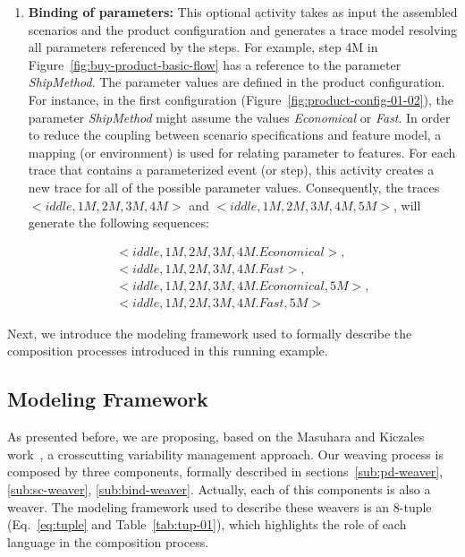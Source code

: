 \documentclass{acm_proc_article-sp}
\begin{document}
\begin{description}
\begin{enumerate}
 \item {\bf Binding of parameters:}  This optional activity takes as input the assembled scenarios and the product configuration and generates 
 a trace model resolving all parameters referenced by the steps. For example, step 4M in Figure~\ref{fig:buy-product-basic-flow} has a reference 
 to the parameter \emph{ShipMethod}. The parameter values are defined in the product configuration. For instance, in the 
 first configuration (Figure~\ref{fig:product-config-01-02}), the parameter \emph{ShipMethod} might assume the values \emph{Economical} or 
 \emph{Fast}. In order to reduce the coupling between scenario specifications and feature model, a mapping (or environment) is used for relating 
 parameter to features. For each trace that contains a parameterized event (or step), this activity creates a new trace for all of the possible parameter 
 values. Consequently, the traces $<iddle,1M,2M,3M,4M>$ and $<iddle, 1M, 2M, 3M, 4M, 5M>$, will generate the following sequences:
 
\begin{small}
\begin{eqnarray*}
<iddle,1M,2M,3M,4M.Economical>, \\ <iddle,1M,2M,3M,4M.Fast>, \\
<iddle,1M,2M,3M,4M.Economical,5M>, \\ <iddle,1M,2M,3M,4M.Fast, 5M>
\end{eqnarray*}
\end{small}
 
\end{enumerate}

Next, we introduce the modeling framework used to formally describe the composition processes introduced in this running example. 
\end{description}

\subsection{Modeling Framework}

As presented before, we are proposing, based on the Masuhara and Kiczales work~\cite{kiczales-ecoop-2003}, a crosscutting 
variability management approach. Our weaving process is composed by three components, formally described in sections~\ref{sub:pd-weaver}, \ref{sub:sc-weaver}, \ref{sub:bind-weaver}. Actually, each of this components is also a weaver. The modeling framework used to describe these weavers is an 8-tuple (Eq.~\ref{eq:tuple} and 
Table~\ref{tab:tup-01}), which highlights the role of each language in the composition process. 
\end{document}
